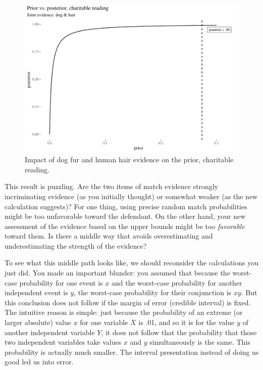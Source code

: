 \documentclass[
  10pt,
  dvipsnames,enabledeprecatedfontcommands]{scrartcl}
\begin{document}
\begin{figure}[H]

\begin{center}\includegraphics[width=0.6\linewidth]{imprecision_philosophical_paper2_files/figure-latex/FigcharitableImpact75-1} \end{center}

\caption{Impact of dog fur and human hair evidence on the prior, charitable reading.}
\label{fig:impactOfCharitable}
\end{figure}

This result is puzzling. Are the two items of match evidence strongly
incriminating evidence (as you initially thought) or somewhat weaker (as
the new calculation suggests)? For one thing, using precise random match
probabilities might be too unfavorable toward the defendant. On the
other hand, your new assessment of the evidence based on the upper
bounds might be too \emph{favorable} toward them. Is there a middle way
that avoids overestimating and underestimating the strength of the
evidence?

To see what this middle path looks like, we should reconsider the
calculations you just did. You made an important blunder: you assumed
that because the worst-case probability for one event is \(x\) and the
worst-case probability for another independent event is \(y\), the
worst-case probability for their conjunction is \(xy\). But this
conclusion does not follow if the margin of error (credible interval) is
fixed. The intuitive reason is simple: just because the probability of
an extreme (or larger absolute) value \(x\) for one variable \(X\) is
.01, and so it is for the value \(y\) of another independent variable
\(Y\), it does not follow that the probability that those two
independent variables take values \(x\) and \(y\) simultaneously is the
same. This probability is actually much smaller. The interval
presentation instead of doing us good led us into error.
\end{document}
